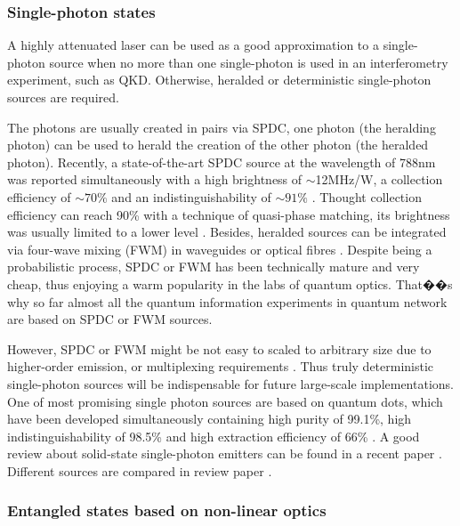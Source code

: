 \documentclass[aps,rmp,twocolumn,amsmath,amssymb,nofootinbib,superscriptaddress,longbibliography,floatfix,table-of-contents,eqsecnum]{revtex4-1}
\begin{document}
%
%

\subsubsection{Single-photon states} 

A highly attenuated laser can be used as a good approximation to a single-photon source when no more than one single-photon is used in an interferometry experiment, such as QKD. Otherwise, heralded or deterministic single-photon sources are required.

The photons are usually created in pairs via SPDC, one photon (the heralding photon) can be used to herald the creation of the other photon (the heralded photon). Recently, a state-of-the-art SPDC source at the wavelength of 788nm was reported simultaneously with a high brightness of $\sim$12MHz/W, a collection efficiency of $\sim 70\%$ and an indistinguishability of $\sim 91\%$ \cite{bib:tenPhotEnt}. Thought collection efficiency can reach 90\% with a technique of quasi-phase matching, its brightness was usually limited to a lower level \cite{giustina2013, christensen2013}. Besides, heralded sources can be integrated via four-wave mixing (FWM) in waveguides  \cite{silverstone2014, spring2016} or optical fibres  \cite{goldschmidt2008, smith2009}. Despite being a probabilistic process, SPDC or FWM has been technically mature and very cheap, thus enjoying a warm popularity in the labs of quantum optics. That��s why so far almost all the quantum information experiments in quantum network are based on SPDC or FWM sources.

However, SPDC or FWM might be not easy to scaled to arbitrary size due to higher-order emission, or multiplexing requirements \cite{bib:RohdeLoopMulti15}. Thus truly deterministic single-photon sources will be indispensable for future large-scale implementations. One of most promising single photon sources are based on quantum dots, which have been developed simultaneously containing high purity of 99.1\%, high indistinguishability of 98.5\% and high extraction efficiency of 66\% \cite{he2013on, wei2014de, ding2016on, somaschi2016, wang2016near, loredo2016}. A good review about solid-state single-photon emitters can be found in a recent paper  \cite{aharonovich2016solid}. Different sources are compared in review paper \cite{eisaman2011}.

%
%

\subsubsection{Entangled states based on non-linear optics} 
\end{document}
